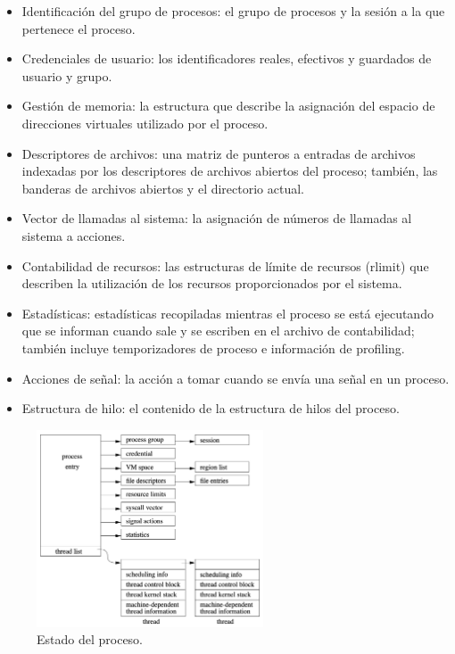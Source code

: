 \begin{itemize}
    \item Identificación del grupo de procesos: el grupo de procesos y la sesión a la que pertenece el proceso.
    \item Credenciales de usuario: los identificadores reales, efectivos y guardados de usuario y grupo.
    \item Gestión de memoria: la estructura que describe la asignación del espacio de direcciones virtuales utilizado por el proceso.
    \item Descriptores de archivos: una matriz de punteros a entradas de archivos indexadas por los descriptores de archivos abiertos del proceso; también, las banderas de archivos abiertos y el directorio actual.
    \item Vector de llamadas al sistema: la asignación de números de llamadas al sistema a acciones.
    \item Contabilidad de recursos: las estructuras de límite de recursos (rlimit) que describen la utilización de los recursos proporcionados por el sistema.
    \item Estadísticas: estadísticas recopiladas mientras el proceso se está ejecutando que se informan cuando sale y se escriben en el archivo de contabilidad; también incluye temporizadores de proceso e información de profiling.
    \item Acciones de señal: la acción a tomar cuando se envía una señal en un proceso.
    \item Estructura de hilo: el contenido de la estructura de hilos del proceso.
\end{itemize}

\begin{figure}[H]
    \centering
    \includegraphics[width=0.6\textwidth]{images/processStructure.png}
    \caption{Estado del proceso.}
    \label{fig:process_state}
\end{figure}

